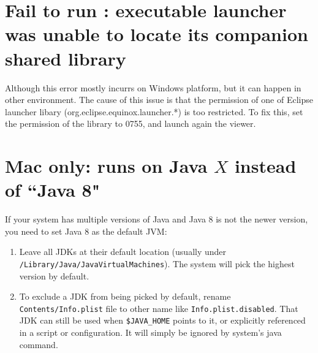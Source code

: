 \documentclass[11pt,letterpaper]{report}
\begin{document}

\section{Fail to run \hpcviewer{}: executable launcher was unable to locate its companion shared library}

Although this error mostly incurrs on Windows platform, but it can happen in other environment. 
The cause of this issue is that the permission of one of Eclipse launcher libary (org.eclipse.equinox.launcher.*) is too restricted. 
To fix this, set the permission of the library to 0755, and launch again the viewer.



\section{Mac only: \hpcviewer{} runs on Java $X$ instead of ``Java 8"}

If your system has multiple versions of Java and Java 8 is not the newer version, you need to set Java 8 as the default JVM:

\begin{enumerate}
\item Leave all JDKs at their default location (usually under \texttt{/Library/Java/JavaVirtualMachines}). The system will pick the highest version by default.
\item To exclude a JDK from being picked by default, rename \texttt{Contents/Info.plist} file to other name like \texttt{Info.plist.disabled}. That JDK can still be used when \texttt{\$JAVA\_HOME} points to it, or explicitly referenced in a script or configuration. It will simply be ignored by system's java command.
\end{enumerate}


\end{document}
